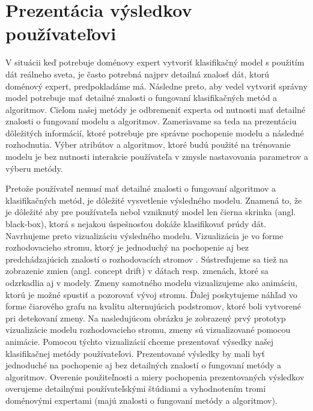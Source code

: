 \section{Prezentácia výsledkov používateľovi}
\label{my-method-prezentacia-vysledkov}
V situácii keď potrebuje doménovy expert vytvoriť klasifikačný model s použitím dát reálneho sveta, je často potrebná najprv detailná znalosť dát, ktorú doménový expert, predpokladáme má.  Následne preto, aby vedel vytvoriť správny model potrebuje mať detailné znalosti o fungovaní klasifikačných metód a algoritmov. Cieľom našej metódy je odbremeniť experta od nutnosti mať detailné znalosti o fungovaní modelu a algoritmov. Zameriavame sa teda na prezentáciu dôležitých informácií, ktoré potrebuje pre správne pochopenie modelu a následné rozhodnutia. Výber atribútov a algoritmov, ktoré budú použité na trénovanie modelu je bez nutnosti interakcie používateľa v zmysle nastavovania parametrov a výberu metódy. 
\par
Pretože používateľ nemusí mať detailné znalosti o fungovaní algoritmov a klasifikačných metód, je dôležité vysvetlenie výsledného modelu. Znamená to, že je dôležité aby pre používateľa nebol vzniknutý model len čierna skrinka (angl. black-box), ktorá s nejakou úspešnosťou dokáže klasifikovať prúdy dát. Navrhujeme preto vizualizáciu výsledného modelu. Vizualizácia je vo forme rozhodovacieho stromu, ktorý je jednoduchý na pochopenie aj bez predchádzajúcich znalostí o rozhodovacích stromov \citep{nguyen2015survey}. Sústreďujeme sa tiež na zobrazenie zmien (angl. concept drift) v dátach resp. zmenách, ktoré sa odzrkadlia aj v modely. Zmeny samotného modelu vizualizujeme ako animáciu, ktorú je možné spustiť a pozorovať vývoj stromu. Ďalej poskytujeme náhľad vo forme čiarového grafu na kvalitu alternujúcich podstromov, ktoré boli vytvorené pri detekovaní zmeny. Na nasledujúcom obrázku je zobrazený prvý prototyp vizualizácie modelu rozhodovacieho stromu, zmeny sú vizualizované pomocou animácie.
\label{fig:exp-vis-prototype}
Pomocou týchto vizualizácií chceme prezentovať výsedky našej klasifikačnej metódy používateľovi. Prezentované výsledky by mali byť jednoduché na pochopenie aj bez detailných znalostí o fungovaní metódy a algoritmov. Overenie použiteľnosti a miery pochopenia prezentovaných výsledkov overujeme detailnými používateľskými štúdiami a vyhodnotením tromi doménovými expertami (majú znalosti o fungovaní metódy a algoritmov). 


